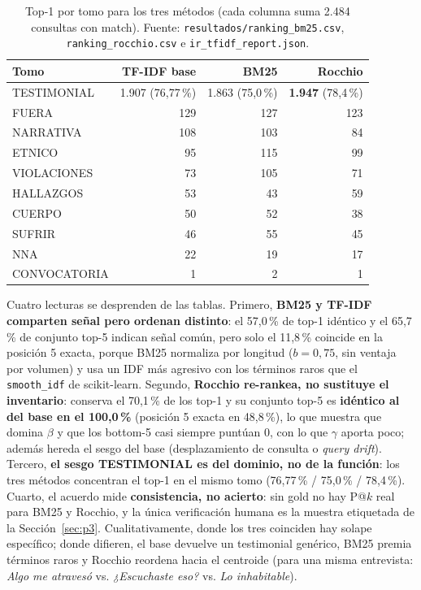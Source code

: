 \documentclass[11pt]{tg_usta}
\begin{document}
\begin{table}[H]
    \centering
    \caption{Top-1 por tomo para los tres métodos (cada columna suma 2.484 consultas con match). Fuente: \texttt{resultados/ranking\_bm25.csv}, \texttt{ranking\_rocchio.csv} e \texttt{ir\_tfidf\_report.json}.}
    \small
    \setlength{\tabcolsep}{6pt}
    \begin{tabular}{l r r r}
    \toprule
    Tomo & TF-IDF base & BM25 & Rocchio \\
    \midrule
    TESTIMONIAL & 1.907 (76,77\,\%) & 1.863 (75,0\,\%) & \textbf{1.947} (78,4\,\%) \\
    FUERA & 129 & 127 & 123 \\
    NARRATIVA & 108 & 103 & 84 \\
    ETNICO & 95 & 115 & 99 \\
    VIOLACIONES & 73 & 105 & 71 \\
    HALLAZGOS & 53 & 43 & 59 \\
    CUERPO & 50 & 52 & 38 \\
    SUFRIR & 46 & 55 & 45 \\
    NNA & 22 & 19 & 17 \\
    CONVOCATORIA & 1 & 2 & 1 \\
    \bottomrule
    \end{tabular}
    \label{tab:top1-tomo}
\end{table}

Cuatro lecturas se desprenden de las tablas. Primero, \textbf{BM25 y TF-IDF comparten señal pero ordenan distinto}: el 57,0\,\% de top-1 idéntico y el 65,7\,\% de conjunto top-5 indican señal común, pero solo el 11,8\,\% coincide en la posición 5 exacta, porque BM25 normaliza por longitud ($b=0{,}75$, sin ventaja por volumen) y usa un IDF más agresivo con los términos raros que el \texttt{smooth\_idf} de scikit-learn. Segundo, \textbf{Rocchio re-rankea, no sustituye el inventario}: conserva el 70,1\,\% de los top-1 y su conjunto top-5 es \textbf{idéntico al del base en el 100,0\,\%} (posición 5 exacta en 48,8\,\%), lo que muestra que domina $\beta$ y que los bottom-5 casi siempre puntúan 0, con lo que $\gamma$ aporta poco; además hereda el sesgo del base (desplazamiento de consulta o \textit{query drift}). Tercero, \textbf{el sesgo TESTIMONIAL es del dominio, no de la función}: los tres métodos concentran el top-1 en el mismo tomo (76,77\,\% / 75,0\,\% / 78,4\,\%). Cuarto, el acuerdo mide \textbf{consistencia, no acierto}: sin gold no hay P@$k$ real para BM25 y Rocchio, y la única verificación humana es la muestra etiquetada de la Sección~\ref{sec:p3}. Cualitativamente, donde los tres coinciden hay solape específico; donde difieren, el base devuelve un testimonial genérico, BM25 premia términos raros y Rocchio reordena hacia el centroide (para una misma entrevista: \textit{Algo me atravesó} vs. \textit{¿Escuchaste eso?} vs. \textit{Lo inhabitable}).
\end{document}
